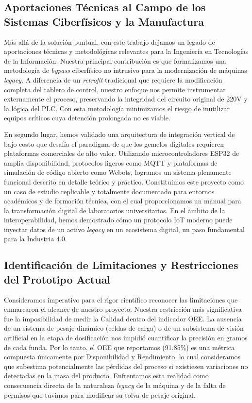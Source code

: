 \subsection{Aportaciones Técnicas al Campo de los Sistemas Ciberfísicos y la Manufactura}

Más allá de la solución puntual, con este trabajo dejamos un legado de aportaciones técnicas y metodológicas relevantes para la Ingeniería en Tecnologías de la Información. Nuestra principal contribución es que formalizamos una metodología de \textit{bypass} ciberfísico no intrusivo para la modernización de máquinas \textit{legacy}. A diferencia de un \textit{retrofit} tradicional que requiere la modificación completa del tablero de control, nuestro enfoque nos permite instrumentar externamente el proceso, preservando la integridad del circuito original de 220V y la lógica del PLC. Con esta metodología minimizamos el riesgo de inutilizar equipos críticos cuya detención prolongada no es viable.

En segundo lugar, hemos validado una arquitectura de integración vertical de bajo costo que desafía el paradigma de que los gemelos digitales requieren plataformas comerciales de alto valor. Utilizando microcontroladores ESP32 de amplia disponibilidad, protocolos ligeros como MQTT y plataformas de simulación de código abierto como Webots, logramos un sistema plenamente funcional descrito en detalle teórico y práctico. Constituimos este proyecto como un caso de estudio replicable y totalmente documentado para entornos académicos y de formación técnica, con el cual proporcionamos un manual para la transformación digital de laboratorios universitarios. En el ámbito de la interoperabilidad, hemos demostrado cómo un protocolo IoT moderno puede inyectar datos de un activo \textit{legacy} en un ecosistema digital, un paso fundamental para la Industria 4.0.

\subsection{Identificación de Limitaciones y Restricciones del Prototipo Actual}

Consideramos imperativo para el rigor científico reconocer las limitaciones que enmarcaron el alcance de nuestro proyecto. Nuestra restricción más significativa fue la imposibilidad de medir la Calidad dentro del indicador OEE. La ausencia de un sistema de pesaje dinámico (celdas de carga) o de un subsistema de visión artificial en la etapa de dosificación nos impidió cuantificar la precisión en gramos de cada funda. Por lo tanto, el OEE que reportamos (91.85\%) es una métrica compuesta únicamente por Disponibilidad y Rendimiento, lo cual consideramos que subestima potencialmente las pérdidas del proceso si existiesen variaciones no detectadas en la masa del producto. Enfrentamos esta realidad como consecuencia directa de la naturaleza \textit{legacy} de la máquina y de la falta de permisos que tuvimos para modificar su tolva de pesaje original.

